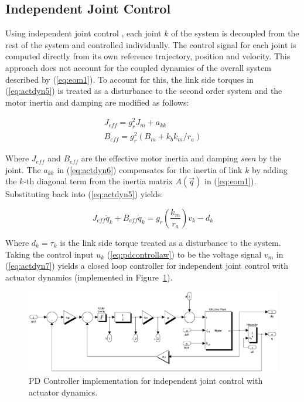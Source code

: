 \subsection{Independent Joint Control} %
\label{sub:independent_joint_control}


Using independent joint control \cite{Sciavicco2001}, each joint $k$ of the system is decoupled from the rest of the system and controlled individually. The control signal for each joint is computed directly from its own reference trajectory, position and velocity. This approach does not account for the coupled dynamics of the overall system described by (\ref{eq:eom1}). To account for this, the link side torques in (\ref{eq:actdyn5}) is treated as a disturbance to the second order system and the motor inertia and damping are modified as follows: 

\begin{equation}
	\begin{array}{l}
		{J_{eff}} = g_r^2{J_m} + {a_{kk}}\\
		{B_{eff}} = g_r^2({B_m} + {k_b}{k_m}/{r_a})
	\end{array}
	\label{eq:actdyn6}
\end{equation}

Where ${J_{eff}}$ and ${B_{eff}}$ are the effective motor inertia and damping \emph{seen} by the joint. The ${a_{kk}}$ in (\ref{eq:actdyn6}) compensates for the inertia of link $k$ by adding the $k$-th diagonal term from the inertia matrix $A(\vec{q})$ in (\ref{eq:eom1}). Substituting back into (\ref{eq:actdyn5}) yields: 

\begin{equation}
	{J_{eff}}{\ddot q_k} + {B_{eff}}{\dot q_k} = g_r^{}\left( {\frac{{{k_m}}}{{{r_a}}}} \right){v_k} - {d_k}
	\label{eq:actdyn7}
\end{equation}

Where ${d_k} = \tau _k$ is the link side torque treated as a disturbance to the system. Taking the control input $u _k$ (\ref{eq:pdcontrollaw}) to be the voltage signal $v _m$ in (\ref{eq:actdyn7}) yields a closed loop controller for independent joint control with actuator dynamics (implemented in Figure~\ref{fig:pdmotorcontroller}).

\begin{figure}[!h]
	\centering
    \includegraphics[scale=0.5]{fig/experiments/pdmotorcontroller.eps} 
  	\caption{PD Controller implementation for independent joint control with actuator dynamics.}
	\label{fig:pdmotorcontroller}
\end{figure}

